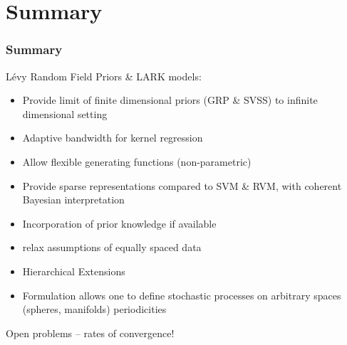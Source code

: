 \documentclass[dvips]{beamer}
\newcommand{\bs}[2]{\begin{frame} \frametitle{#1} 
{#2}
\end{frame} }
\begin{document}
\section{Summary}
\bs{Summary} {
L\'evy Random Field Priors \& LARK models: 
  \begin{itemize}
  \item Provide limit of finite dimensional priors (GRP \& SVSS) to infinite
  dimensional setting
  \item Adaptive bandwidth for kernel regression
  \item Allow flexible generating functions (non-parametric)
  \item Provide sparse representations compared to SVM \& RVM, with
    coherent Bayesian interpretation
  \item Incorporation of  prior knowledge if available
  \item relax assumptions of equally spaced data
  \item Hierarchical Extensions
  \item Formulation allows one to define stochastic processes on
    arbitrary spaces (spheres, manifolds) periodicities

\end{itemize}
Open problems -- rates of convergence!

}
\end{document}
